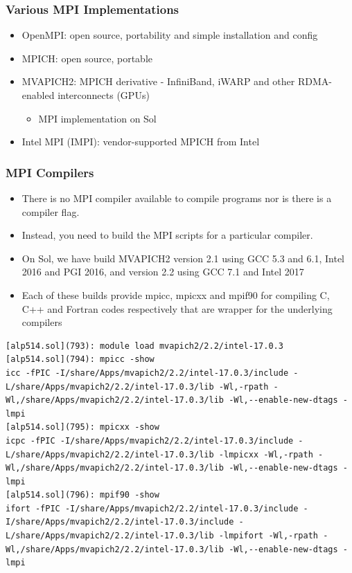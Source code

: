 \documentclass[10pt,t]{beamer}
\begin{document}
\begin{frame}
  \frametitle{Various MPI Implementations}
  \begin{itemize}
    \item OpenMPI: open source, portability and simple installation and config
    \item MPICH: open source, portable
    \item MVAPICH2: MPICH derivative - InfiniBand, iWARP and other RDMA-enabled interconnects (GPUs)
      \begin{itemize}
        \item MPI implementation on Sol
      \end{itemize}
    \item Intel MPI (IMPI): vendor-supported MPICH from Intel
  \end{itemize}
\end{frame}

\begin{frame}[fragile]
  \frametitle{MPI Compilers}
  \begin{itemize}
    \item There is no MPI compiler available to compile programs nor is there is a compiler flag.
    \item Instead, you need to build the MPI scripts for a particular compiler.
    \item On Sol, we have build MVAPICH2 version 2.1 using GCC 5.3 and  6.1, Intel 2016 and PGI 2016, and version 2.2 using GCC 7.1 and Intel 2017
    \item Each of these builds provide mpicc, mpicxx and mpif90 for compiling C, C++ and Fortran codes respectively that are wrapper for the underlying compilers
  \end{itemize}
  \begin{lstlisting}[basicstyle=\tiny\ttfamily]
[alp514.sol](793): module load mvapich2/2.2/intel-17.0.3
[alp514.sol](794): mpicc -show
icc -fPIC -I/share/Apps/mvapich2/2.2/intel-17.0.3/include -L/share/Apps/mvapich2/2.2/intel-17.0.3/lib -Wl,-rpath -Wl,/share/Apps/mvapich2/2.2/intel-17.0.3/lib -Wl,--enable-new-dtags -lmpi
[alp514.sol](795): mpicxx -show
icpc -fPIC -I/share/Apps/mvapich2/2.2/intel-17.0.3/include -L/share/Apps/mvapich2/2.2/intel-17.0.3/lib -lmpicxx -Wl,-rpath -Wl,/share/Apps/mvapich2/2.2/intel-17.0.3/lib -Wl,--enable-new-dtags -lmpi
[alp514.sol](796): mpif90 -show
ifort -fPIC -I/share/Apps/mvapich2/2.2/intel-17.0.3/include -I/share/Apps/mvapich2/2.2/intel-17.0.3/include -L/share/Apps/mvapich2/2.2/intel-17.0.3/lib -lmpifort -Wl,-rpath -Wl,/share/Apps/mvapich2/2.2/intel-17.0.3/lib -Wl,--enable-new-dtags -lmpi
  \end{lstlisting}
\end{frame}
\end{document}

